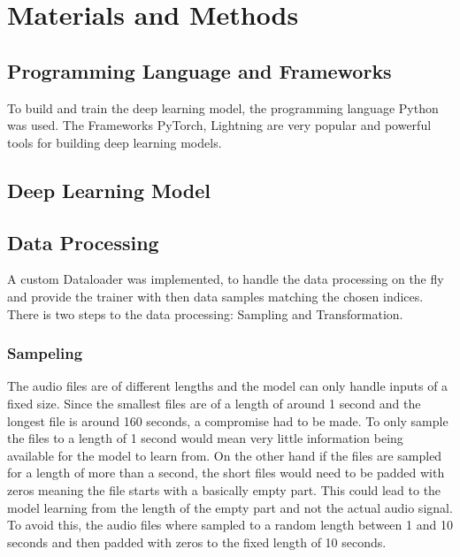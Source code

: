 

\section{Materials and Methods}
\label{section2}

\subsection{Programming Language and Frameworks}
To build and train the deep learning model, the programming language Python was used.
The Frameworks PyTorch, Lightning are very popular and powerful tools for building deep learning models.

\subsection{Deep Learning Model}

\subsection{Data Processing}
A custom Dataloader was implemented, to handle the data processing on the fly
and provide the trainer with then data samples matching the chosen indices.
There is two steps to the data processing: Sampling and Transformation.

\subsubsection{Sampeling}
The audio files are of different lengths and the model can only handle inputs of a fixed size.
Since the smallest files are of a length of around 1 second and the longest file is around
160 seconds, a compromise had to be made. To only sample the files to a length of 1 second
would mean very little information being available for the model to learn from. On the other
hand if the files are sampled for a length of more than a second, the short files would need
to be padded with zeros meaning the file starts with a basically empty part. This could lead
to the model learning from the length of the empty part and not the actual audio signal.
To avoid this, the audio files where sampled to a random length between 1 and 10 seconds and
then padded with zeros to the fixed length of 10 seconds.

